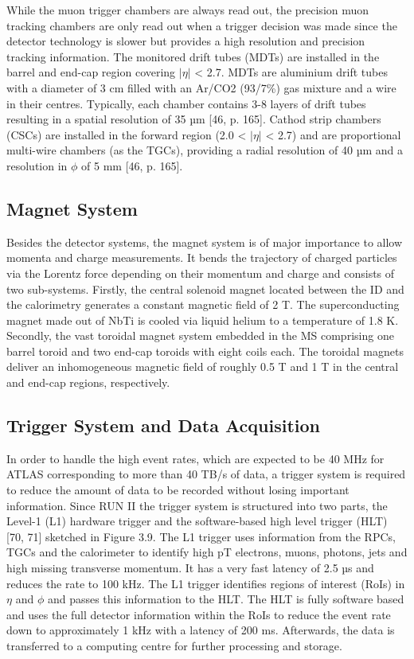 While the muon trigger chambers are always read out, the precision muon tracking chambers are
only read out when a trigger decision was made since the detector technology is slower but provides a high resolution and precision tracking information. The monitored drift tubes (MDTs) are installed in the barrel and end-cap region covering $|\eta|$ < 2.7. MDTs are aluminium drift tubes with a diameter of 3 cm filled with an Ar/CO2 (93/7\%) gas mixture and a wire in their centres. Typically, each chamber contains 3-8 layers of drift tubes resulting in a spatial resolution of 35 µm [46, p. 165]. Cathod strip chambers (CSCs) are installed in the forward region (2.0 < $|\eta|$ < 2.7) and are proportional multi-wire chambers (as the TGCs), providing a radial resolution of 40 µm and a resolution in $\phi$ of 5 mm [46, p. 165].


\subsection{Magnet System}

Besides the detector systems, the magnet system is of major importance to allow momenta and charge measurements. It bends the trajectory of charged particles via the Lorentz force depending on their momentum and charge and consists of two sub-systems. Firstly, the central solenoid magnet located between the ID and the calorimetry generates a constant magnetic field of 2 T. The superconducting magnet made out of NbTi is cooled via liquid helium to a temperature of 1.8 K. Secondly, the vast toroidal magnet system embedded in the MS comprising one barrel toroid and two end-cap toroids with eight coils each. The toroidal magnets deliver an inhomogeneous magnetic field of roughly 0.5 T and 1 T in the central and end-cap regions, respectively.

\subsection{Trigger System and Data Acquisition}

In order to handle the high event rates, which are expected to be 40 MHz for ATLAS corresponding to more than 40 TB/s of data, a trigger system is required to reduce the amount of data to be recorded without losing important information. Since RUN II the trigger system is structured into two parts, the Level-1 (L1) hardware trigger and the software-based high level trigger (HLT) [70, 71] sketched in Figure 3.9. The L1 trigger uses information from the RPCs, TGCs and the calorimeter to identify high pT electrons, muons, photons, jets and high missing transverse momentum. It has a very fast latency of 2.5 µs and reduces the rate to 100 kHz. The L1 trigger identifies regions of interest (RoIs) in $\eta$ and $\phi$ and passes this information to the HLT. The HLT is fully software based and uses the full detector information within the RoIs to reduce the event rate down to approximately 1 kHz with a latency of 200 ms. Afterwards, the data is transferred to a computing centre for further processing and storage.

